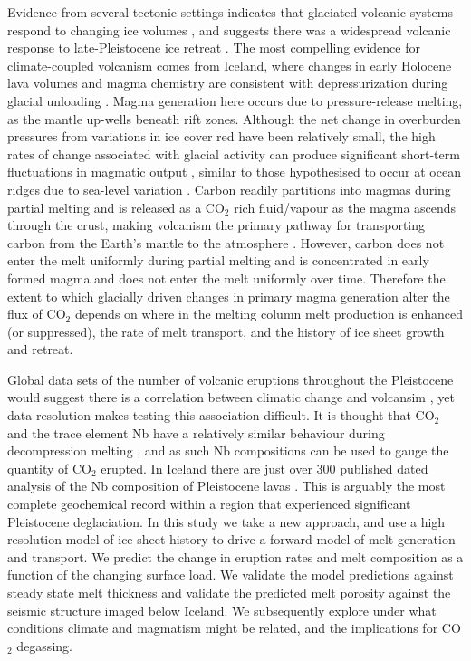 \documentclass[draft,linenumbers]{agujournal2018}
\begin{document}
Evidence from several tectonic settings indicates that glaciated volcanic systems respond to changing ice volumes \citep{sigvaldason-etal-1992,jull-1996,maclennan-etal-2002,glazner-etal-1999,jellinek-etal-2004,rawson-etal-2016}, and suggests there was a widespread volcanic response to late-Pleistocene ice retreat \citep{huybers-2009}. The most compelling evidence for climate-coupled volcanism comes from Iceland, where changes in early Holocene lava volumes and magma chemistry are consistent with depressurization during glacial unloading \citep{jull-1996,maclennan-etal-2002,sinton-etal-2005}. Magma generation here occurs due to pressure-release melting, as the mantle up-wells beneath rift zones. Although the net change in overburden pressures from variations in ice cover red have been relatively small, the high rates of change associated with glacial activity can produce significant short-term fluctuations in magmatic output \citep{jull-1996,pagli-2008,schmidt-etal-2013}, similar to those hypothesised to occur at ocean ridges due to sea-level variation \citep{huybers-2009,lund-2011,crowley-etal-2015,burley-2015}. Carbon readily partitions into magmas during partial melting \citep{rosenthal-etal-2015} and is released as a CO$_{2}$ rich fluid/vapour as the magma ascends through the crust, making volcanism the primary pathway for transporting carbon from the Earth's mantle to the atmosphere \citep{dasgupta-2010}. However, carbon does not enter the melt uniformly during partial melting and is concentrated in early formed magma and does not enter the melt uniformly over time. Therefore the extent to which glacially driven changes in primary magma generation alter the flux of CO$_{2}$ depends on where in the melting column melt production is enhanced (or suppressed), the rate of melt transport, and the history of ice sheet growth and retreat.

Global data sets of the number of volcanic eruptions throughout the Pleistocene would suggest there is a correlation between climatic change and volcansim \citep{huybers-2009}, yet data resolution makes testing this association difficult. It is thought that CO$_2$ and the trace element Nb have a relatively similar behaviour during decompression melting \citep{saal-etal-2002}, and as such Nb compositions can be used to gauge the quantity of CO$_2$ erupted. In Iceland there are just over 300 published dated analysis of the Nb composition of Pleistocene lavas \citep{gee-etal-1998,easton-etal-2015}. This is arguably the most complete geochemical record within a region that experienced significant Pleistocene deglaciation. In this study we take a new approach, and use a high resolution model of ice sheet history to drive a forward model of melt generation and transport. We predict the change in eruption rates and melt composition as a function of the changing surface load. We validate the model predictions against steady state melt thickness and validate the predicted melt porosity against the seismic structure imaged below Iceland. We subsequently explore under what conditions climate and magmatism might be related, and the implications for CO$_{2}$ degassing.
\end{document}
